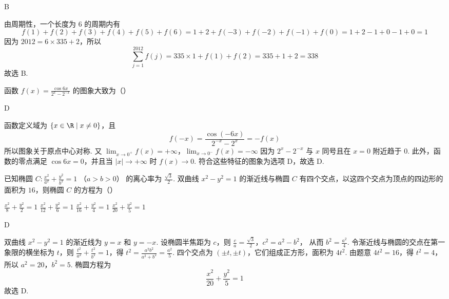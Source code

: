 \begin{answer}
B
\end{answer}

\begin{solution}
由周期性，一个长度为 \(6\) 的周期内有
\[
f(1)+f(2)+f(3)+f(4)+f(5)+f(6)
=1+2+f(-3)+f(-2)+f(-1)+f(0)
=1+2-1+0-1+0=1
\]
因为 \(2012=6\times335+2\)，所以
\[
\sum_{j=1}^{2012}f(j)=335\times1+f(1)+f(2)=335+1+2=338
\]
故选 B.
\end{solution}

\begin{problem}
函数 \( f(x) = \frac{\cos 6x}{2^x - 2^{-x}} \) 的图象大致为（\quad）

    {}
    {}
    {}
\end{problem}

\begin{answer}
D
\end{answer}

\begin{solution}
函数定义域为 \(\{x\in\R\mid x\ne0\}\)，且
\[
f(-x)=\frac{\cos(-6x)}{2^{-x}-2^x}=-f(x)
\]
所以图象关于原点中心对称. 又
\(\displaystyle\lim_{x\to0^+}f(x)=+\infty\)，\(\displaystyle\lim_{x\to0^-}f(x)=-\infty\)
因为 \(2^x-2^{-x}\) 与 \(x\) 同号且在 \(x=0\) 附近趋于 \(0\). 此外，函数的零点满足 \(\cos6x=0\)，并且当 \(|x|\to+\infty\) 时 \(f(x)\to0\). 符合这些特征的图象为选项 D，故选 D.
\end{solution}

\begin{problem}
已知椭圆 \(C: \frac{x^2}{a^2} + \frac{y^2}{b^2} = 1\) （\(a > b > 0\)） 的离心率为 \(\frac{\sqrt{3}}{2}\). 双曲线 \(x^2 - y^2 = 1\) 的渐近线与椭圆 \(C\) 有四个交点，以这四个交点为顶点的四边形的面积为 \(16\)，则椭圆 \(C\) 的方程为（\quad）

\choices
    {\(\frac{x^2}{8} + \frac{y^2}{2} = 1\)}
    {\(\frac{x^2}{12} + \frac{y^2}{6} = 1\)}
    {\(\frac{x^2}{16} + \frac{y^2}{4} = 1\)}
    {\(\frac{x^2}{20} + \frac{y^2}{5} = 1\)}
\end{problem}

\begin{answer}
D
\end{answer}

\begin{solution}
双曲线 \(x^2-y^2=1\) 的渐近线为 \(y=x\) 和 \(y=-x\). 设椭圆半焦距为 \(c\)，则
\(\frac ca=\frac{\sqrt3}{2}\)，\(c^2=a^2-b^2\)，
从而 \(b^2=\frac{a^2}{4}\). 令渐近线与椭圆的交点在第一象限的横坐标为 \(t\)，则
\(\frac{t^2}{a^2}+\frac{t^2}{b^2}=1\)，得 \(t^2=\frac{a^2b^2}{a^2+b^2}=\frac{a^2}{5}\).
四个交点为 \((\pm t,\pm t)\)，它们组成正方形，面积为 \(4t^2\). 由题意
\(4t^2=16\)，得 \(t^2=4\)，
所以 \(a^2=20\)，\(b^2=5\). 椭圆方程为
\[
\frac{x^2}{20}+\frac{y^2}{5}=1
\]
故选 D.
\end{solution}

